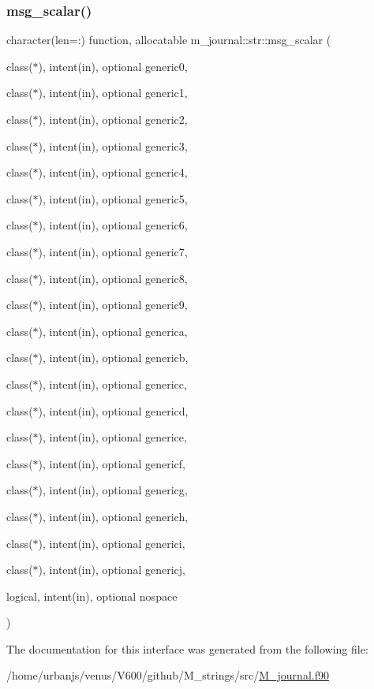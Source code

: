 \subsubsection{\texorpdfstring{msg\+\_\+scalar()}{msg\_scalar()}}
{\footnotesize\ttfamily character(len=\+:) function, allocatable m\+\_\+journal\+::str\+::msg\+\_\+scalar (\begin{DoxyParamCaption}\item[{class($\ast$), intent(in), optional}]{generic0,  }\item[{class($\ast$), intent(in), optional}]{generic1,  }\item[{class($\ast$), intent(in), optional}]{generic2,  }\item[{class($\ast$), intent(in), optional}]{generic3,  }\item[{class($\ast$), intent(in), optional}]{generic4,  }\item[{class($\ast$), intent(in), optional}]{generic5,  }\item[{class($\ast$), intent(in), optional}]{generic6,  }\item[{class($\ast$), intent(in), optional}]{generic7,  }\item[{class($\ast$), intent(in), optional}]{generic8,  }\item[{class($\ast$), intent(in), optional}]{generic9,  }\item[{class($\ast$), intent(in), optional}]{generica,  }\item[{class($\ast$), intent(in), optional}]{genericb,  }\item[{class($\ast$), intent(in), optional}]{genericc,  }\item[{class($\ast$), intent(in), optional}]{genericd,  }\item[{class($\ast$), intent(in), optional}]{generice,  }\item[{class($\ast$), intent(in), optional}]{genericf,  }\item[{class($\ast$), intent(in), optional}]{genericg,  }\item[{class($\ast$), intent(in), optional}]{generich,  }\item[{class($\ast$), intent(in), optional}]{generici,  }\item[{class($\ast$), intent(in), optional}]{genericj,  }\item[{logical, intent(in), optional}]{nospace }\end{DoxyParamCaption})\hspace{0.3cm}{\ttfamily [private]}}



The documentation for this interface was generated from the following file\+:\begin{DoxyCompactItemize}
\item 
/home/urbanjs/venus/\+V600/github/\+M\+\_\+strings/src/\mbox{\hyperlink{M__journal_8f90}{M\+\_\+journal.\+f90}}\end{DoxyCompactItemize}

